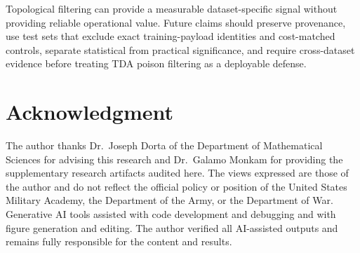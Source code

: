 \documentclass[conference]{IEEEtran}
\begin{document}
Topological filtering can provide a measurable dataset-specific signal without
providing reliable operational value. Future claims should preserve provenance,
use test sets that exclude exact training-payload identities and cost-matched
controls, separate statistical from
practical significance, and require cross-dataset evidence before treating TDA
poison filtering as a deployable defense.

\section*{Acknowledgment}
The author thanks Dr.\ Joseph Dorta of the Department of Mathematical Sciences for advising this research and Dr.\ Galamo Monkam for providing the supplementary research artifacts audited here. The views expressed are those of the author and do not reflect the official policy or position of the United States Military Academy, the Department of the Army, or the Department of War. Generative AI tools assisted with code development and debugging and with figure generation and editing. The author verified all AI-assisted outputs and remains fully responsible for the content and results.
\end{document}
